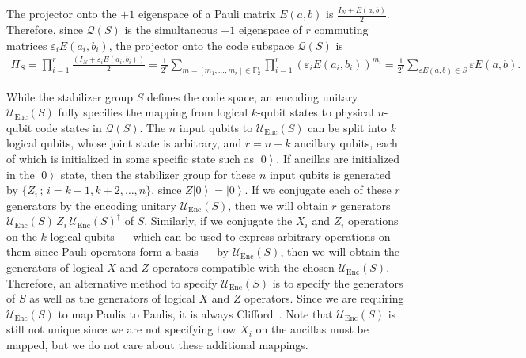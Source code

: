 \documentclass[journal,onecolumn]{IEEEtran}
\newcommand{\dket}[1]{\left\lvert #1 \right\rangle}
\begin{document}
The projector onto the $+1$ eigenspace of a Pauli matrix $E(a,b)$ is $\frac{I_N + E(a,b)}{2}$.
Therefore, since $\mathcal{Q}(S)$ is the simultaneous $+1$ eigenspace of $r$ commuting matrices $\varepsilon_i E(a_i,b_i)$, the projector onto the code subspace $\mathcal{Q}(S)$ is
\begin{align}
\label{eq:stabilizer_projector}
\Pi_S = \prod_{i=1}^r \frac{(I_N + \varepsilon_i E(a_i,b_i))}{2} = \frac{1}{2^r} \sum_{m = [m_1,\ldots,m_r] \in \mathbb{F}_2^r} \prod_{i=1}^r \left( \varepsilon_i E(a_i,b_i) \right)^{m_i} = \frac{1}{2^r} \sum_{\varepsilon E(a,b) \in S} \varepsilon E(a,b).
\end{align}

While the stabilizer group $S$ defines the code space, an encoding unitary $\mathcal{U}_{\text{Enc}}(S)$ fully specifies the mapping from logical $k$-qubit states to physical $n$-qubit code states in $\mathcal{Q}(S)$.
The $n$ input qubits to $\mathcal{U}_{\text{Enc}}(S)$ can be split into $k$ logical qubits, whose joint state is arbitrary, and $r = n-k$ ancillary qubits, each of which is initialized in some specific state such as $\dket{0}$.
If ancillas are initialized in the $\dket{0}$ state, then the stabilizer group for these $n$ input qubits is generated by $\{ Z_i \, ; \, i = k+1,k+2,\ldots,n \}$, since $Z \dket{0} = \dket{0}$.
If we conjugate each of these $r$ generators by the encoding unitary $\mathcal{U}_{\text{Enc}}(S)$, then we will obtain $r$ generators $\mathcal{U}_{\text{Enc}}(S) \, Z_i \, \mathcal{U}_{\text{Enc}}(S)^\dagger$ of $S$.
Similarly, if we conjugate the $X_i$ and $Z_i$ operations on the $k$ logical qubits --- which can be used to express arbitrary operations on them since Pauli operators form a basis --- by $\mathcal{U}_{\text{Enc}}(S)$, then we will obtain the generators of logical $X$ and $Z$ operators compatible with the chosen $\mathcal{U}_{\text{Enc}}(S)$.
Therefore, an alternative method to specify $\mathcal{U}_{\text{Enc}}(S)$ is to specify the generators of $S$ as well as the generators of logical $X$ and $Z$ operators.
Since we are requiring $\mathcal{U}_{\text{Enc}}(S)$ to map Paulis to Paulis, it is always Clifford~\cite{Gottesman-icgtmp98}.
Note that $\mathcal{U}_{\text{Enc}}(S)$ is still not unique since we are not specifying how $X_i$ on the ancillas must be mapped, but we do not care about these additional mappings.
\end{document}
